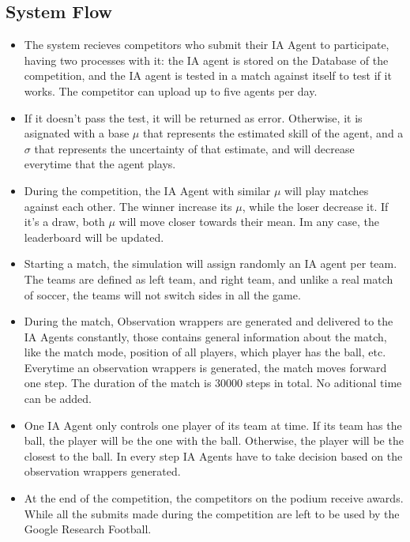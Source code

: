 \subsection*{System Flow}
\begin{itemize}
\item The system recieves competitors who submit their IA Agent to participate, having two processes with it: the IA agent is stored on the Database of the competition, and the IA agent is tested in a match against itself to test if it works. The competitor can upload up to five agents per day.

\item If it doesn't pass the test, it will be returned as error. Otherwise, it is asignated with a base $\mu$ that represents the estimated skill of the agent, and a $\sigma$ that represents the uncertainty of that estimate, and will decrease everytime that the agent plays.

\item During the competition, the IA Agent with similar $\mu$ will play matches against each other. The winner increase its $\mu$, while the loser decrease it. If it's a draw, both $\mu$ will move closer towards their mean. Im any case, the leaderboard will be updated.

\item Starting a match, the simulation will assign randomly an IA agent per team. The teams are defined as left team, and right team, and unlike a real match of soccer, the teams will not switch sides in all the game.

\item During the match, Observation wrappers are generated and delivered to the IA Agents constantly, those contains general information about the match, like the match mode, position of all players, which player has the ball, etc. Everytime an observation wrappers is generated, the match moves forward one step. The duration of the match is 30000 steps in total. No aditional time can be added.

\item One IA Agent only controls one player of its team at time. If its team has the ball, the player will be the one with the ball. Otherwise, the player will be the closest to the ball. In every step IA Agents have to take decision based on the observation wrappers generated.

\item At the end of the competition, the competitors on the podium receive awards. While all the submits made during the competition are left to be used by the Google Research Football.
\end{itemize}